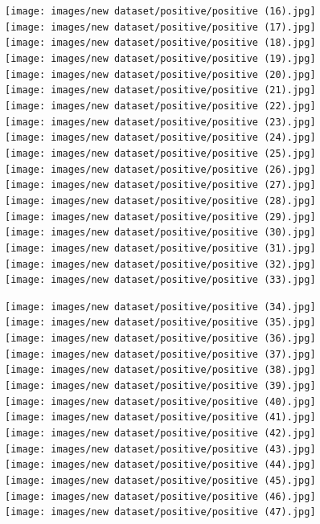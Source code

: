 \begin{figure}[H]
\centering
\texttt{[image: images/new dataset/positive/positive (16).jpg]}\quad
\texttt{[image: images/new dataset/positive/positive (17).jpg]}\quad
\vspace{5mm}
\texttt{[image: images/new dataset/positive/positive (18).jpg]}\quad
\texttt{[image: images/new dataset/positive/positive (19).jpg]}\quad
\texttt{[image: images/new dataset/positive/positive (20).jpg]}\quad
\vspace{5mm}
\texttt{[image: images/new dataset/positive/positive (21).jpg]}
\quad
\texttt{[image: images/new dataset/positive/positive (22).jpg]}\quad
\texttt{[image: images/new dataset/positive/positive (23).jpg]}\quad
\vspace{5mm}
\texttt{[image: images/new dataset/positive/positive (24).jpg]}\quad
\texttt{[image: images/new dataset/positive/positive (25).jpg]}\quad
\texttt{[image: images/new dataset/positive/positive (26).jpg]}\quad
\vspace{5mm}
\texttt{[image: images/new dataset/positive/positive (27).jpg]}\quad
\texttt{[image: images/new dataset/positive/positive (28).jpg]}\quad
\texttt{[image: images/new dataset/positive/positive (29).jpg]}\quad
\texttt{[image: images/new dataset/positive/positive (30).jpg]}\quad
\texttt{[image: images/new dataset/positive/positive (31).jpg]}\quad
\texttt{[image: images/new dataset/positive/positive (32).jpg]}\quad
\texttt{[image: images/new dataset/positive/positive (33).jpg]}\quad
\end{figure}

\begin{figure}[H]
\centering
\texttt{[image: images/new dataset/positive/positive (34).jpg]}\quad
\texttt{[image: images/new dataset/positive/positive (35).jpg]}
\quad
\texttt{[image: images/new dataset/positive/positive (36).jpg]}\quad
\vspace{5mm}
\texttt{[image: images/new dataset/positive/positive (37).jpg]}\quad
\texttt{[image: images/new dataset/positive/positive (38).jpg]}\quad
\texttt{[image: images/new dataset/positive/positive (39).jpg]}\quad
\vspace{5mm}
\texttt{[image: images/new dataset/positive/positive (40).jpg]}\quad
\texttt{[image: images/new dataset/positive/positive (41).jpg]}\quad
\texttt{[image: images/new dataset/positive/positive (42).jpg]}\quad
\vspace{5mm}
\texttt{[image: images/new dataset/positive/positive (43).jpg]}\quad
\texttt{[image: images/new dataset/positive/positive (44).jpg]}\quad
\vspace{5mm}
\texttt{[image: images/new dataset/positive/positive (45).jpg]}\quad
\texttt{[image: images/new dataset/positive/positive (46).jpg]}\quad
\vspace{5mm}
\texttt{[image: images/new dataset/positive/positive (47).jpg]}\quad
\end{figure}

